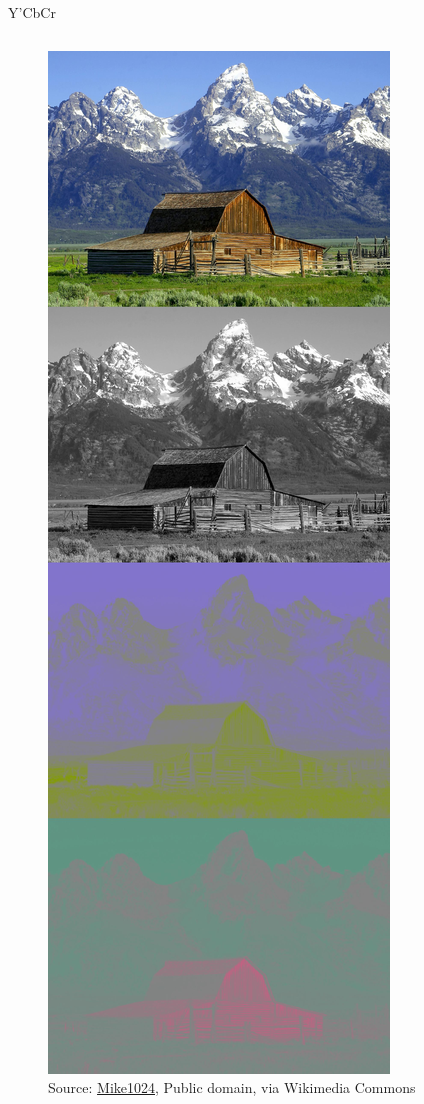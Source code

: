 \documentclass[aspectratio=169,usepdftitle=false]{fireshonks}
\begin{document}
\begin{frame}{Y'CbCr}
\begin{columns}
\begin{column}
\begin{figure}
                \includegraphics[height=10\baselineskip,keepaspectratio]{figures/Barns_grand_tetons_YCbCr_separation.jpg}
                \caption*{Source: \href{https://commons.wikimedia.org/wiki/File:Barns_grand_tetons_YCbCr_separation.jpg}{Mike1024}, Public domain, via Wikimedia Commons}
            \end{figure}
        \end{column}
    \end{columns}
\end{frame}
\end{document}
